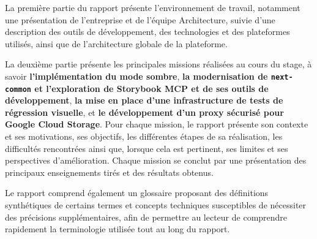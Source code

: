 La première partie du rapport présente l'environnement de travail, notamment une présentation de l'entreprise et de l'équipe Architecture, suivie d'une description des outils de développement, des technologies et des plateformes utilisés, ainsi que de l'architecture globale de la plateforme.

La deuxième partie présente les principales missions réalisées au cours du stage, à savoir \textbf{l'implémentation du mode sombre}, \textbf{la modernisation de \texttt{next-common} et l'exploration de Storybook MCP et de ses outils de développement}, \textbf{la mise en place d'une infrastructure de tests de régression visuelle}, et \textbf{le développement d'un proxy sécurisé pour Google Cloud Storage}. Pour chaque mission, le rapport présente son contexte et ses motivations, ses objectifs, les différentes étapes de sa réalisation, les difficultés rencontrées ainsi que, lorsque cela est pertinent, ses limites et ses perspectives d'amélioration. Chaque mission se conclut par une présentation des principaux enseignements tirés et des résultats obtenus.

Le rapport comprend également un glossaire proposant des définitions synthétiques de certains termes et concepts techniques susceptibles de nécessiter des précisions supplémentaires, afin de permettre au lecteur de comprendre rapidement la terminologie utilisée tout au long du rapport.
